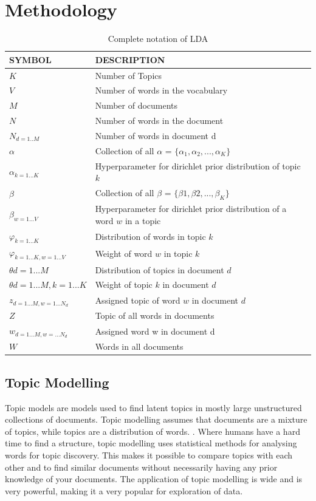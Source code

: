 \chapter{Methodology}  \label{ch:methodology}

\begin{table}[h]
\centering
 \begin{tabular}{l l} 
 \hline
 SYMBOL & DESCRIPTION \\ 
 \hline
 $K$ & Number of Topics \\  
 $V$ & Number of words in the vocabulary \\
 $M$ & Number of documents \\
 $N$ & Number of words in the document \\
 $N_{d=1..M}$ & Number of words in document d\\
 $\alpha$ & Collection of all $\alpha$ = $ \{ \alpha_{1},\alpha_{2}, ... , \alpha_{K}\}$ \\
 $\alpha_{k=1...K}$ & Hyperparameter for dirichlet prior distribution of topic $k$ \\
 $\beta$ &  Collection of all $\beta$ = $\{\beta{1},\beta{2}, ... , \beta_{K}\}$ \\
 $\beta_{w=1...V}$ & Hyperparameter for dirichlet prior distribution of a word $w$ in a topic \\
 $\varphi_{k=1...K}$ & Distribution of words in topic $k$ \\
 $\varphi_{k=1...K, w=1...V}$ & Weight of  word $w$ in topic $k$  \\
 $\theta{d=1...M}$ & Distribution of topics in document $d$  \\
 $\theta{d=1...M, k=1...K}$ & Weight of  topic $k$ in document $d$ \\
 $z_{d=1...M, w=1...N_d}$ & Assigned topic of word $w$ in document $d$\\
 $Z$ & Topic of all words in documents \\
 $w_{d=1...M, w=...N_d}$ & Assigned word w in document d \\ 
 $W$ & Words in all documents \\ 

 \hline
 \end{tabular}
\caption{Complete notation of LDA}
\label{tab:table1}
\end{table}

\section{Topic Modelling}\label{lda:tm}
Topic models are models used to find latent topics in mostly large unstructured collections of documents. Topic modelling assumes that documents are a mixture of topics, while topics are a distribution of words. \cite{Blei2010ProbabilisticModels}. Where humans have a hard time to find a structure, topic modelling uses statistical methods for analysing words for topic discovery. This makes it possible to compare topics with each other and to find similar documents without necessarily having any prior knowledge of your documents. The application of topic modelling is wide and is very powerful, making it a very popular for exploration of data. 

